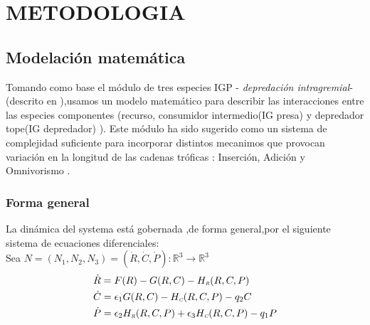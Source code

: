 \section{METODOLOGIA}

\subsection{Modelaci\'on matem\'atica}

Tomando como base el m\'odulo de tres especies  IGP - \emph{depredaci\'on intragremial}-(descrito en \citealt{polis1989ecology,polis1992intraguild}),usamos un modelo matem\'atico \citep{holt1997theoretical} para describir las interacciones entre las especies componentes (recurso, consumidor intermedio(IG presa) y depredador tope(IG depredador) ). Este m\'odulo ha sido sugerido como un sistema de complejidad suficiente para incorporar distintos mecanimos que provocan variaci\'on en la longitud de las cadenas tr\'oficas : Inserci\'on, Adici\'on y Omnivorismo \citep{TP2007proximate}.

\subsubsection{Forma general}
La din\'amica del systema est\'a gobernada ,de forma general,por el siguiente sistema de ecuaciones diferenciales: \\
Sea $ N= (N_1,N_2,N_3) = (\dot{R} , \dot{C} , \dot{P}) : \mathbb{R}^3 \to \mathbb{R}^3 $
\begin{equation}\label{eq:Gsystem}
\begin{aligned}
&\dot{R} = F(R) -G(R,C)-H_{\textit{\tiny R}}(R,C,P)  \\
&\dot{C} = \epsilon_1 G(R,C)-H_{\textit{\tiny C}}(R,C,P) - q_2 C  \\
&\dot{P} = \epsilon_2 H_{\textit{\tiny R}}(R,C,P) +\epsilon_3 H_{\textit{\tiny C}}(R,C,P) -q_1 P
\end{aligned}
\end{equation}
